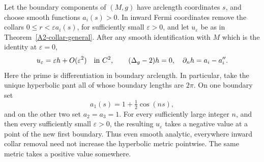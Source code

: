 \begin{proposition}\label{A2-collar-shape}
Let the boundary components of $(M,g)$ have arclength coordinates $s$, and choose smooth functions $a_i(s)>0$. In inward Fermi coordinates remove the collars
$0\le r<\varepsilon a_i(s)$, for sufficiently small $\varepsilon>0$, and let $u_\varepsilon$ be as in Theorem~\ref{A2-collar-general}. After any smooth identification with $M$ which is the identity at $\varepsilon=0$,
\[
 u_\varepsilon=\varepsilon h+O(\varepsilon^2)\quad\hbox{in }C^2,
 \qquad
 (\Delta_g-2)h=0,\quad \partial_nh=a_i-a_i''.
\]
Here the prime is differentiation in boundary arclength. In particular, take the unique hyperbolic pant all of whose boundary lengths are $2\pi$. On one boundary set
\[
 a_1(s)=1+\tfrac12\cos(ns),
\]
and on the other two set $a_2=a_3=1$. For every sufficiently large integer $n$, and then every sufficiently small $\varepsilon>0$, the resulting $u_\varepsilon$ takes a negative value at a point of the new first boundary. Thus even smooth analytic, everywhere inward collar removal need not increase the hyperbolic metric pointwise. The same metric takes a positive value somewhere.
\end{proposition}
